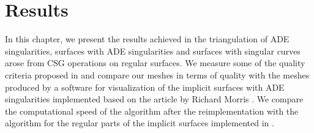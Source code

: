 \newcommand*{\MinNumberC}{0.5}%
\newcommand*{\MidNumberC}{0.75}%
\newcommand*{\MaxNumberC}{1.0}%
  
\newcommand{\ApplyGradientC}[1]{%
  \iftoggle{inTableHeader}{#1}{
    \ifdim #1 pt > \MidNumberC pt
        \pgfmathsetmacro{\PercentColor}{max(min(100.0*(#1 - \MidNumberC)/(\MaxNumberC-\MidNumberC),100.0),0.00)} %
        \colorbox{red!\PercentColor!yellow}{#1}
    \else
        \pgfmathsetmacro{\PercentColor}{max(min(100.0*(\MidNumberC - #1)/(\MidNumberC-\MinNumberC),100.0),0.00)} %
        \colorbox{green!\PercentColor!yellow}{#1}
    \fi
  }
  }

  
\newcommand*{\MinNumberD}{0.5}%
\newcommand*{\MidNumberD}{0.75}%
\newcommand*{\MaxNumberD}{1.0}%

\newcommand{\ApplyGradientD}[1]{%
  \iftoggle{inTableHeader}{#1}{
    \ifdim #1 pt > \MidNumberD pt
        \pgfmathsetmacro{\PercentColor}{max(min(100.0*(#1 - \MidNumberD)/(\MaxNumberD-\MidNumberD),100.0),0.00)} %
        \colorbox{red!\PercentColor!yellow}{#1}
    \else
        \pgfmathsetmacro{\PercentColor}{max(min(100.0*(\MidNumberD - #1)/(\MidNumberD-\MinNumberD),100.0),0.00)} %
        \colorbox{green!\PercentColor!yellow}{#1}
    \fi
  }
  }
  

\renewcommand{\arraystretch}{1}
\setlength{\fboxsep}{2mm} %
\setlength{\tabcolsep}{-4pt}








\chapter{Results}
\label{chap4}

In this chapter, we present the results achieved in the triangulation of
ADE singularities, surfaces with ADE singularities and surfaces with 
singular curves arose from CSG operations on regular surfaces.
We measure some of the quality criteria proposed in \cite{korecova2021triangulation}
and compare our meshes in terms of quality with the meshes produced by a software 
for visualization of the implicit surfaces with ADE singularities implemented
based on the article by Richard Morris \cite{morris2003client}.
We compare the computational speed of the algorithm after the reimplementation
with the algorithm for the regular parts of the implicit surfaces 
implemented in \cite{korecova2021triangulation}.

